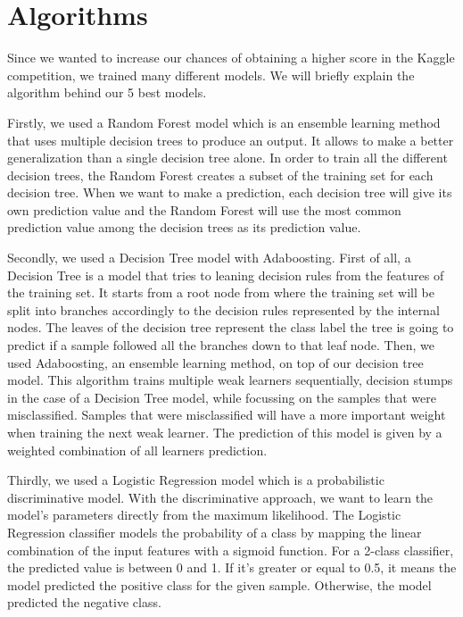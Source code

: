 \documentclass{article} %
\begin{document}
\section{Algorithms}

Since we wanted to increase our chances of obtaining a higher score in the Kaggle competition, we trained many different models. We will 
briefly explain the algorithm behind our 5 best models.

Firstly, we used a Random Forest model which is an ensemble learning method that uses multiple decision trees to produce an output. 
It allows to make a better generalization than a single decision tree alone. In order to train all the different decision trees, 
the Random Forest creates a subset of the training set for each decision tree. When we want to make a prediction, each decision tree will 
give its own prediction value and the Random Forest will use the most common prediction value among the decision trees as its prediction value.

Secondly, we used a Decision Tree model with Adaboosting. First of all, a Decision Tree is a model that tries to leaning decision rules from the 
features of the training set. It starts from a root node from where the training set will be split into branches accordingly to the decision rules 
represented by the internal nodes. The leaves of the decision tree represent the class label the tree is going to predict if a sample followed all 
the branches down to that leaf node. Then, we used Adaboosting, an ensemble learning method, on top of our decision tree model. This algorithm trains 
multiple weak learners sequentially, decision stumps in the case of a Decision Tree model, while focussing on the samples that were misclassified. 
Samples that were misclassified will have a more important weight when training the next weak learner. The prediction of this model is given by a 
weighted combination of all learners prediction.

Thirdly, we used a Logistic Regression model which is a probabilistic discriminative model. With the discriminative approach, we want to learn the 
model's parameters directly from the maximum likelihood. The Logistic Regression classifier models the probability of a class by mapping the linear 
combination of the input features with a sigmoid function. For a 2-class classifier, the predicted value is between 0 and 1. If it's greater or equal 
to 0.5, it means the model predicted the positive class for the given sample. Otherwise, the model predicted the negative class. 
\end{document}
